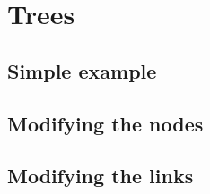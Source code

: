 \newpage
\section{Trees}


\newpage
\subsection{Simple example}




\newpage
\subsection{Modifying the nodes}




\newpage
\subsection{Modifying the links}



